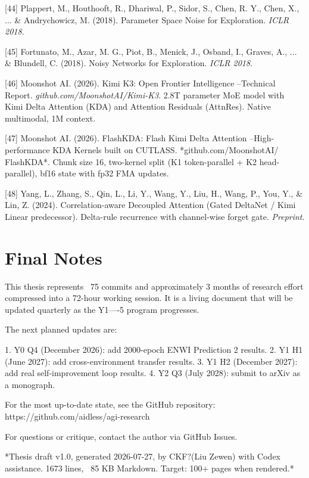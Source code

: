 \documentclass[11pt]{article}
\begin{document}
[44] Plappert, M., Houthooft, R., Dhariwal, P., Sidor, S., Chen, R. Y., Chen,
    X., ... \& Andrychowicz, M. (2018). Parameter Space Noise for Exploration.
    \textit{ICLR 2018}.

[45] Fortunato, M., Azar, M. G., Piot, B., Menick, J., Osband, I., Graves, A.,
    ... \& Blundell, C. (2018). Noisy Networks for Exploration. \textit{ICLR 2018}.

[46] Moonshot AI. (2026). Kimi K3: Open Frontier Intelligence --Technical
    Report. \textit{github.com/MoonshotAI/Kimi-K3}. 2.8T parameter MoE model
    with Kimi Delta Attention (KDA) and Attention Residuals (AttnRes).
    Native multimodal, 1M context.

[47] Moonshot AI. (2026). FlashKDA: Flash Kimi Delta Attention --High-
    performance KDA Kernels built on CUTLASS. *github.com/MoonshotAI/
    FlashKDA*. Chunk size 16, two-kernel split (K1 token-parallel + K2
    head-parallel), bf16 state with fp32 FMA updates.

[48] Yang, L., Zhang, S., Qin, L., Li, Y., Wang, Y., Liu, H., Wang, P.,
    You, Y., \& Lin, Z. (2024). Correlation-aware Decoupled Attention
    (Gated DeltaNet / Kimi Linear predecessor). Delta-rule recurrence
    with channel-wise forget gate. \textit{Preprint}.

\hrulefill

\section{Final Notes}


This thesis represents ~75 commits and approximately 3 months of research
effort compressed into a 72-hour working session. It is a living document
that will be updated quarterly as the Y1----5 program progresses.

The next planned updates are:

1. Y0 Q4 (December 2026): add 2000-epoch ENWI Prediction 2 results.
2. Y1 H1 (June 2027): add cross-environment transfer results.
3. Y1 H2 (December 2027): add real self-improvement loop results.
4. Y2 Q3 (July 2028): submit to arXiv as a monograph.

For the most up-to-date state, see the GitHub repository:
https://github.com/aidless/agi-research

For questions or critique, contact the author via GitHub Issues.

\hrulefill

*Thesis draft v1.0, generated 2026-07-27, by CKF?(Liu Zewen) with Codex
assistance. 1673 lines, ~85 KB Markdown. Target: 100+ pages when rendered.*
\end{document}
